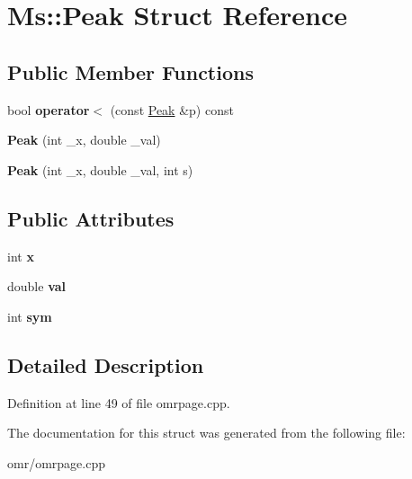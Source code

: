 \hypertarget{struct_ms_1_1_peak}{}\section{Ms\+:\+:Peak Struct Reference}
\label{struct_ms_1_1_peak}
\subsection*{Public Member Functions}
\begin{DoxyCompactItemize}
\item 
\mbox{\label{struct_ms_1_1_peak_ad9a732ec3e9035d37e30df8070278aa5}} 
bool {\bfseries operator$<$} (const \hyperlink{struct_ms_1_1_peak}{Peak} \&p) const
\item 
\mbox{\label{struct_ms_1_1_peak_a775de3e58bbcc6e51efa101bbba77a41}} 
{\bfseries Peak} (int \+\_\+x, double \+\_\+val)
\item 
\mbox{\label{struct_ms_1_1_peak_ac988921100a67c34d632a1a184beeb97}} 
{\bfseries Peak} (int \+\_\+x, double \+\_\+val, int s)
\end{DoxyCompactItemize}
\subsection*{Public Attributes}
\begin{DoxyCompactItemize}
\item 
\mbox{\label{struct_ms_1_1_peak_aede8ade15db42a05175b899fa79cee1f}} 
int {\bfseries x}
\item 
\mbox{\label{struct_ms_1_1_peak_a0f6923aa4c62a17716464c3f388837ee}} 
double {\bfseries val}
\item 
\mbox{\label{struct_ms_1_1_peak_acfcd40a1486abff0a7c135f5101d9239}} 
int {\bfseries sym}
\end{DoxyCompactItemize}


\subsection{Detailed Description}


Definition at line 49 of file omrpage.\+cpp.



The documentation for this struct was generated from the following file\+:\begin{DoxyCompactItemize}
\item 
omr/omrpage.\+cpp\end{DoxyCompactItemize}
